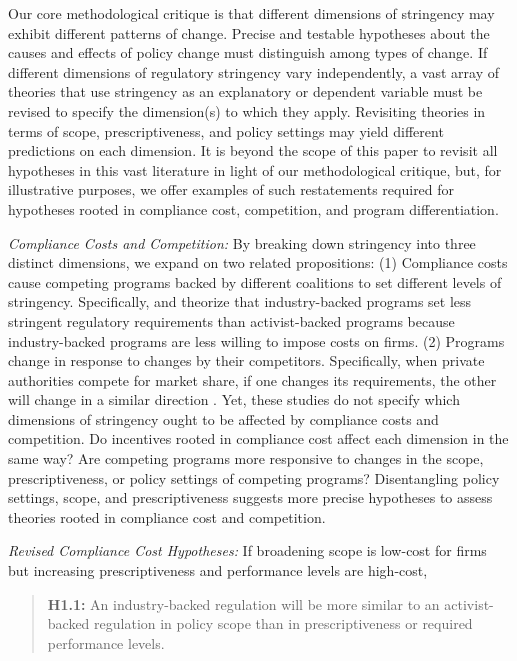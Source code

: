 \documentclass[
      12pt,
            Review ]{article}
\begin{document}
Our core methodological critique is that different dimensions of stringency may exhibit different patterns of change. Precise and testable hypotheses about the causes and effects of policy change must distinguish among types of change. If different dimensions of regulatory stringency vary independently, a vast array of theories that use stringency as an explanatory or dependent variable must be revised to specify the dimension(s) to which they apply. Revisiting theories in terms of scope, prescriptiveness, and policy settings may yield different predictions on each dimension. It is beyond the scope of this paper to revisit all hypotheses in this vast literature in light of our methodological critique, but, for illustrative purposes, we offer examples of such restatements required for hypotheses rooted in compliance cost, competition, and program differentiation.

\emph{Compliance Costs and Competition:} By breaking down stringency into three distinct dimensions, we expand on two related propositions: (1) Compliance costs cause competing programs backed by different coalitions to set different levels of stringency. Specifically, \citet{Cashore2004} and \citet{Fischer2014} theorize that industry-backed programs set less stringent regulatory requirements than activist-backed programs because industry-backed programs are less willing to impose costs on firms. (2) Programs change in response to changes by their competitors. Specifically, when private authorities compete for market share, if one changes its requirements, the other will change in a similar direction \citep{Fischer2014, Smith2010}. Yet, these studies do not specify which dimensions of stringency ought to be affected by compliance costs and competition. Do incentives rooted in compliance cost affect each dimension in the same way? Are competing programs more responsive to changes in the scope, prescriptiveness, or policy settings of competing programs? Disentangling policy settings, scope, and prescriptiveness suggests more precise hypotheses to assess theories rooted in compliance cost and competition.

\emph{Revised Compliance Cost Hypotheses:} If broadening scope is low-cost for firms but increasing prescriptiveness and performance levels are high-cost,

\begin{quote}
\textbf{H1.1:} An industry-backed regulation will be more similar to an activist-backed regulation in policy scope than in prescriptiveness or required performance levels.
\end{quote}
\end{document}
